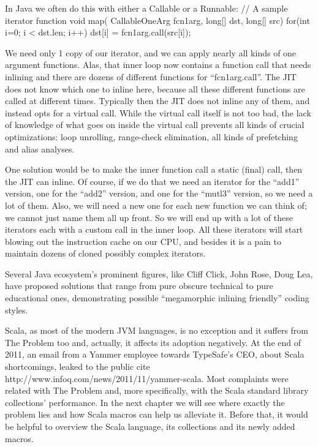 In Java we often do this with either a Callable or a Runnable:
// A sample iterator function
void map( CallableOneArg fcn1arg, long[] dst, long[] src) {
  for(int i=0; i < dst.len; i++)
    dst[i] = fcn1arg.call(src[i]);
}
  
We need only 1 copy of our iterator, and we can apply nearly all kinds of one
argument functions. Alas, that inner loop now contains a function call that
needs inlining and there are dozens of different functions for ``fcn1arg.call''.
The JIT does not know which one to inline here, because all these different
functions are called at different times.  Typically then the JIT does not inline
any of them, and instead opts for a virtual call.  While the virtual call
itself is not too bad, the lack of knowledge of what goes on inside the virtual
call prevents all kinds of crucial optimizations: loop unrolling, range-check
elimination, all kinds of prefetching and alias analyses.

One solution  would be to make the inner function call a static (final)
call, then the JIT can inline. Of course, if we do that we need an iterator for
the ``add1'' version, one for the ``add2'' version, and one for the
``mutl3'' version, so we need a lot of them. Also, we will need a new one for
each new function we can think of; we cannot just name them all up front.  So we
will end up with a lot of these iterators each with a custom call in the inner
loop. All these iterators will start blowing out the instruction cache on our
CPU, and besides it is a pain to maintain dozens of cloned possibly complex
iterators.

Several Java ecosystem's prominent figures, like Cliff Click, John Rose, Doug
Lea, have proposed solutions that range from pure obscure technical to pure
educational ones, demonstrating possible ``megamorphic inlining friendly''
coding styles.

Scala, as most of the modern JVM languages, is no exception and it suffers from
The Problem too and, actually, it affects its adoption negatively. At the end of
2011, an email from a Yammer employee towards TypeSafe's CEO, about Scala
shortcomings, leaked to the public {cite
http://www.infoq.com/news/2011/11/yammer-scala}. Most complaints were related
with The Problem and, more specifically, with the Scala standard
library collections' performance. In the next chapter we will see where exactly
the problem lies and how Scala macros can help us alleviate it. Before that, it
would be helpful to overview the Scala language, its collections and its newly
added macros.


